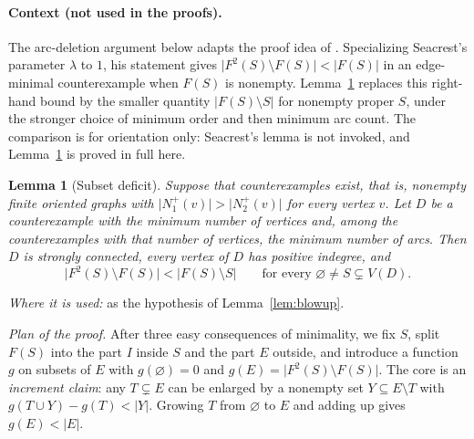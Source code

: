 \documentclass[11pt]{article}
\newtheorem{lemma}[theorem]{Lemma}
\theoremstyle{remark}
\newcommand{\abs}[1]{\lvert #1\rvert}
\begin{document}
\paragraph{Context (not used in the proofs).}
The arc-deletion argument below adapts the proof idea of
\cite[Lemma~4]{Seacrest2019}. Specializing Seacrest's parameter $\lambda$
to $1$, his statement gives
$\abs{F^2(S)\setminus F(S)}<\abs{F(S)}$ in an edge-minimal
counterexample when $F(S)$ is nonempty. Lemma~\ref{lem:subset-deficit}
replaces this right-hand bound by the smaller quantity
$\abs{F(S)\setminus S}$ for nonempty proper $S$, under the stronger choice of
minimum order and then minimum arc count. The comparison is for orientation
only: Seacrest's lemma is not invoked, and
Lemma~\ref{lem:subset-deficit} is proved in full here.

\begin{lemma}[Subset deficit]
\label{lem:subset-deficit}
Suppose that counterexamples exist, that is, nonempty finite oriented graphs
with $\abs{N_1^+(v)}>\abs{N_2^+(v)}$ for every vertex $v$. Let $D$ be a
counterexample with the minimum number of vertices and, among the
counterexamples with that number of vertices, the minimum number of arcs.
Then $D$ is strongly connected, every vertex of $D$ has positive indegree, and
\begin{equation}
\label{eq:subset-deficit}
  \abs{F^2(S)\setminus F(S)}<\abs{F(S)\setminus S}
  \qquad\text{for every }\varnothing\ne S\subsetneq V(D).
\end{equation}
\end{lemma}

\emph{Where it is used:} as the hypothesis of Lemma~\ref{lem:blowup}.

\emph{Plan of the proof.} After three easy consequences of minimality, we
fix $S$, split $F(S)$ into the part $I$ inside $S$ and the part $E$ outside,
and introduce a function $g$ on subsets of $E$ with
$g(\varnothing)=0$ and $g(E)=\abs{F^2(S)\setminus F(S)}$. The core is an
\emph{increment claim}: any $T\subsetneq E$ can be enlarged by a nonempty
set $Y\subseteq E\setminus T$ with $g(T\cup Y)-g(T)<\abs Y$. Growing $T$
from $\varnothing$ to $E$ and adding up gives $g(E)<\abs E$.
\end{document}

